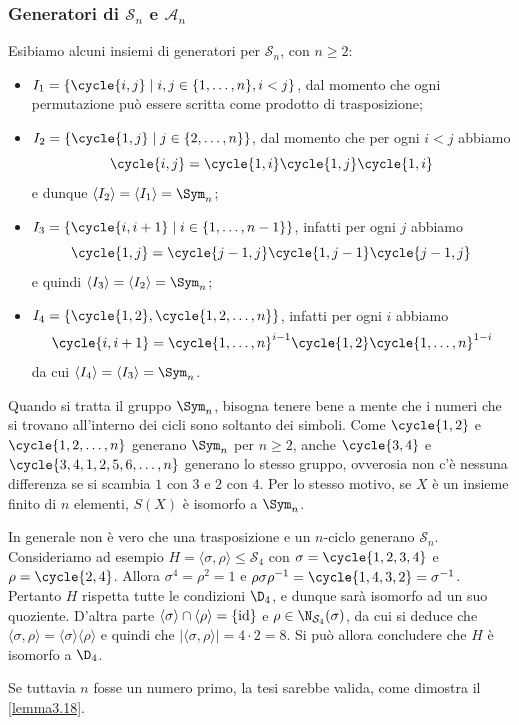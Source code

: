 \documentclass[11pt]{scrartcl}
\begin{document}
	\subsubsection{Generatori di \texorpdfstring{$\mathcal{S}_n$}{Sₙ} e \texorpdfstring{$\mathcal{A}_n$}{Aₙ}}
	
	Esibiamo alcuni insiemi di generatori per $\mathcal{S}_n$, con $n \geq 2$:
	
	\begin{itemize}
		\item $I_1 = \{\cycle{i, j} \mid i, j \in\{1, \ldots, n\}, i < j\}$, dal momento che
		ogni permutazione può essere scritta come prodotto di trasposizione;
		\item $I_2 = \{\cycle{1, j}\mid j \in \{2, \ldots, n\}\}$, dal momento che per ogni $i<j$ abbiamo
		\[
		\cycle{i, j} = \cycle{1, i}\cycle{1, j}\cycle{1, i}
		\]
		e dunque $\langle I_2 \rangle = \langle I_1 \rangle = \Sym_n$;
		\item $I_3 = \{\cycle{i, i + 1}\mid i \in\{1, \ldots, n - 1\}\}$,
		infatti per ogni $j$ abbiamo 
		\[
		\cycle{1, j} = \cycle{j - 1, j}\cycle{1, j - 1}\cycle{j - 1, j}
		\]
		e quindi $\langle I_3 \rangle = \langle I_2 \rangle = \Sym_n$;
		\item $I_4 = \{\cycle{1, 2}, \cycle{1, 2, \ldots, n}\}$, infatti per ogni
		$i$ abbiamo 
		\[
		\cycle{i, i + 1} = \cycle{1, \ldots, n}^{i - 1}\cycle{1, 2}\cycle{1, \ldots, n}^{1 - i}
		\]
		da cui $\langle I_4 \rangle = \langle I_3 \rangle = \Sym_n$.
	\end{itemize}
	
	\begin{remark}
		Quando si tratta il gruppo $\Sym_n$, bisogna tenere bene a mente che i numeri
		che si trovano all'interno dei cicli sono soltanto dei simboli. Come
		$\cycle{1, 2}$ e $\cycle{1, 2, \ldots, n}$ generano $\Sym_n$ per $n \geq 2$,
		anche $\cycle{3, 4}$ e $\cycle{3, 4, 1, 2, 5, 6, \ldots, n}$ generano lo stesso gruppo,
		ovverosia non c'è nessuna differenza se si scambia $1$ con $3$ e $2$ con $4$.
		Per lo stesso motivo, se $X$ è un insieme finito di $n$ elementi, $S(X)$ è
		isomorfo a $\Sym_n$.
	\end{remark}
	
	\begin{remark}
		In generale non è vero che una trasposizione e un $n$-ciclo generano $\mathcal{S}_n$.
		Consideriamo ad esempio $H = \langle\sigma, \rho\rangle\leqslant \mathcal{S}_4$ con
		$\sigma = \cycle{1, 2, 3, 4}$ e $\rho = \cycle{2, 4}$. Allora
		$\sigma^4 = \rho^2 = 1$ e $\rho\sigma\rho^{-1} = \cycle{1, 4, 3, 2} =
		\sigma^{-1}$. Pertanto $H$ rispetta tutte le condizioni $\D_4$, e dunque sarà
		isomorfo ad un suo quoziente. D'altra parte $\langle\sigma\rangle\cap \langle\rho\rangle = \{\mathrm{id}\}$
		e $\rho \in \N_{\mathcal{S}_4}(\sigma)$, da cui si deduce che $\langle\sigma, \rho\rangle =
		\langle\sigma\rangle\langle\rho\rangle$ e quindi che $\lvert \langle\sigma, \rho\rangle\rvert = 4 \cdot 2 = 8$. Si può allora concludere che
		$H$ è isomorfo a $\D_4$. \medskip
		
		
		Se tuttavia $n$ fosse un numero primo, la tesi sarebbe valida, come dimostra il
		\autoref{lemma3.18}. 
	\end{remark}
\end{document}
